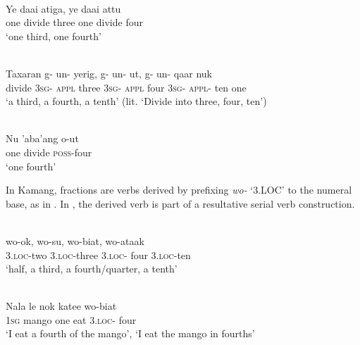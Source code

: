 \documentclass[output=paper]{LSP/langsci}
\begin{document}
\ea%
\label{bkm:Ref342746525}
 
\\
\gll   Ye  daai  atiga,  ye   daai  attu\\  
   one   divide  three   one  divide  four \\
\glt  `one third, one fourth'   
\z

 

\ea%
\label{bkm:Ref342746583}
\\
\gll  Taxaran  g-  un-  yerig,  g-  un-  ut,  g-  un-  qaar nuk \\  
   divide  \textsc{3sg}-  \textsc{appl} three  \textsc{3sg-}  \textsc{appl} four  \textsc{3sg-}  \textsc{appl-} ten one   \\
\glt  `a third, a fourth, a tenth' (lit. `Divide into three, four, ten')
\z


 

\ea
\label{ex:8:1248}
\\
\gll Nu  'aba'ang  o-ut\\
  one  divide  \textsc{poss}{}-four\\
\glt `one fourth'
\z 

  

In Kamang, fractions are verbs derived by prefixing \textit{wo-} `3.LOC' to the numeral base, as in . In , the derived verb is part of a resultative serial verb construction.


\ea%
\label{bkm:Ref342746224}
\\
\gll wo-ok,    wo-su,  wo-biat,  wo-ataak     \\  
   3.\textsc{loc-}two    3.\textsc{loc-}three  3.\textsc{loc-} four  3.\textsc{loc-}ten   \\
\glt `half, a third, a fourth/quarter, a tenth' 
\z

   

 

 


\ea%
\label{bkm:Ref342746258}
\\
\gll  Nala  le  nok  katee  wo-biat  \\  
   \textsc{1sg } mango  one  eat  3.\textsc{loc-} four    \\
\glt `I eat a fourth of the mango', `I eat the mango in fourths'
\z

     
\end{document}
